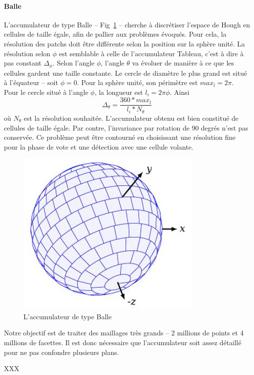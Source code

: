 ﻿\documentclass[12pt, twoside]{article}
\begin{document}
\paragraph{Balle}
L’accumulateur de type Balle -- Fig~\ref{fig:Ball} -- cherche à discrétiser l’espace de Hough en cellules de taille égale, afin de pallier aux problèmes évoqués. Pour cela, la résolution des patchs doit être différente selon la position sur la sphère unité. La résolution selon $\phi$ est semblable à celle de l’accumulateur Tableau, c’est à dire à pas constant $\Delta_{\phi}$. Selon l’angle $\phi$, l’angle $\theta$ va évoluer de manière à ce que les cellules gardent une taille constante. Le cercle de diamètre le plus grand est situé à l’équateur -- soit $\phi = 0$. Pour la sphère unité, son périmètre est $max_l = 2\pi$. Pour le cercle situé à l’angle $\phi$, la longueur est $l_i = 2\pi \phi$. Ainsi
$$\Delta_{\theta} = \dfrac{360*max_l}{l_i*N_{\theta}}$$
où $N_{\theta}$ est la résolution souhaitée. L’accumulateur obtenu est bien constitué de cellules de taille égale. Par contre, l’invariance par rotation de 90 degrés n’est pas conservée. Ce problème peut être contourné en choisissant une résolution fine pour la phase de vote et une détection avec une cellule volante.

\begin{figure}[h]
\centering
\includegraphics[scale=0.65]{Ball.png}
\caption{\label{fig:Ball} L'accumulateur de type Balle}
\end{figure}

Notre objectif est de traiter des maillages très grands -- 2 millions de points et 4 millions de facettes. Il est donc nécessaire que l'accumulateur soit assez détaillé pour ne pas confondre plusieurs plans.

XXX
\end{document}
